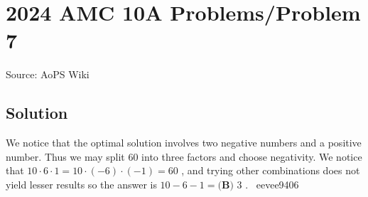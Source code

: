 \documentclass[12pt]{article}
\begin{document}
\section*{{2024 AMC 10A Problems/Problem 7}}
Source: AoPS Wiki

\subsection*{Solution}
We notice that the optimal solution involves two negative numbers and a positive number. Thus we may split $60$ into three factors and choose negativity. We notice that $10\cdot6\cdot1=10\cdot(-6)\cdot(-1)=60$ , and trying other combinations does not yield lesser results so the answer is $10-6-1=\boxed{\textbf{(B) }3}$ . ~eevee9406
\end{document}
